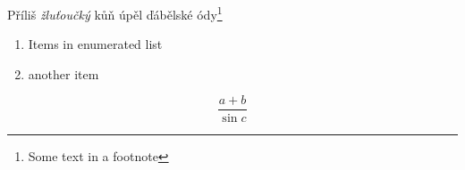 \documentclass{article}
\begin{document}
Příliš \textit{žluťoučký} kůň úpěl ďábělské ódy\footnote{Some text in a footnote}

\begin{enumerate}
\item Items in enumerated list
\item another item
\end{enumerate}

\[\frac{a + b}{\sin{c}}\]
\end{document}
